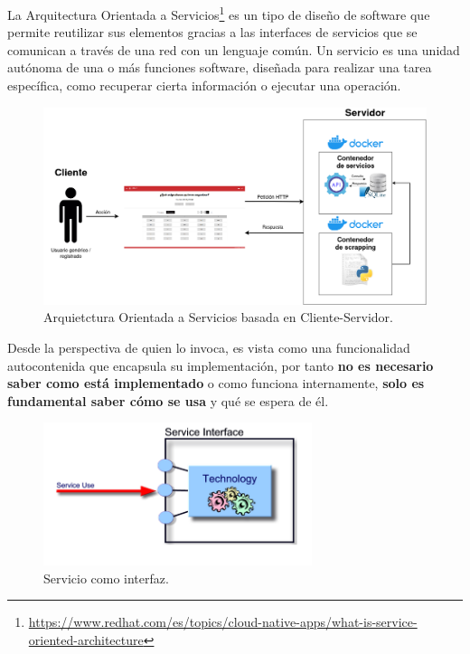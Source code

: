 La Arquitectura Orientada a Servicios\footnote{\url{https://www.redhat.com/es/topics/cloud-native-apps/what-is-service-oriented-architecture}} es un tipo de diseño de software que permite reutilizar sus elementos gracias a las interfaces de servicios que se comunican a través de una red con un lenguaje común. Un servicio es una unidad autónoma de una o más funciones software, diseñada para realizar una tarea específica, como recuperar cierta información o ejecutar una operación.\newline

\begin{figure}[H]
    \centering
    \includegraphics[width=1\textwidth]{./imagenes/Arq_Soft_informal.png}
    \caption{Arquietctura Orientada a Servicios basada en Cliente-Servidor.}
\end{figure}

Desde la perspectiva de quien lo invoca, es vista como una funcionalidad autocontenida que encapsula su implementación, por tanto \textbf{no es necesario saber como está implementado} o como funciona internamente, \textbf{solo es fundamental saber cómo se usa} y qué se espera de él.

\begin{figure}[H]
    \centering
    \includegraphics[width=0.7\textwidth]{./imagenes/Interfaz_SOA.png}
    \caption{Servicio como interfaz.}
\end{figure}

